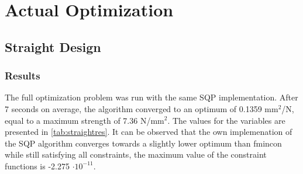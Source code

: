 
\section{Actual Optimization}
\subsection{Straight Design}

\subsubsection{Results}
The full optimization problem was run with the same SQP implementation. 
After 7 seconds on average, the algorithm converged to an optimum of 0.1359 mm$^2$/N, equal to a maximum strength of 7.36 N/mm$^2$. 
The values for the variables are presented in \cref{tab:straightres}. 
It can be observed that the own implemenation of the SQP algorithm converges towards a slightly lower optimum than fmincon while still satisfying all constraints, the maximum value of the constraint functions is -2.275 $\cdot 10^{-11}$.


